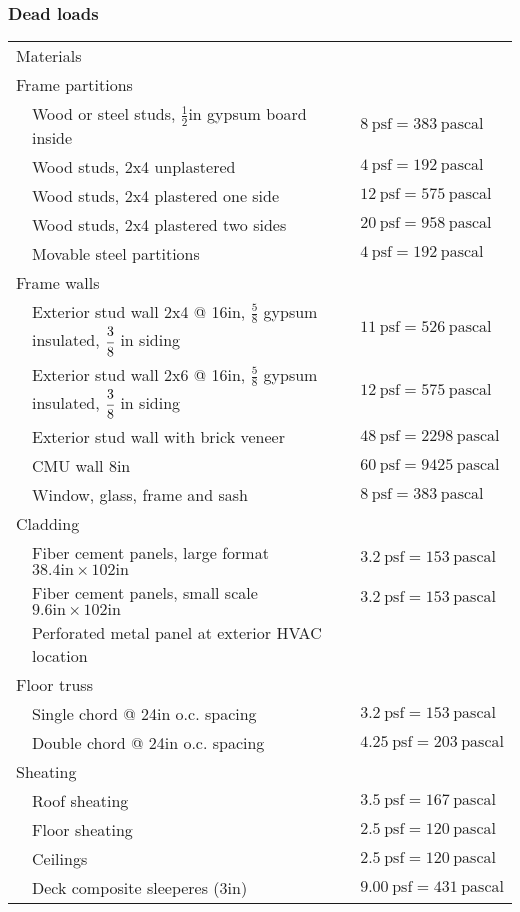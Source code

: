 
\subsubsection{Dead loads}
\begin{table}[h!]
\begin{tabular}{lp{8cm}p{10cm}}
\multicolumn{3}{l}{Materials}\\


\multicolumn{3}{l}{Frame partitions}\\
& Wood or steel studs, $\frac{1}{2}$in gypsum board inside & $8\ \mathrm{psf}= 383 \ \mathrm{pascal}$ \\
& Wood studs, 2x4 unplastered & $4\ \mathrm{psf}=192 \ \mathrm{pascal}$\\
& Wood studs, 2x4 plastered one side & $12\ \mathrm{psf}= 575\ \mathrm{pascal}$\\
& Wood studs, 2x4 plastered two sides & $20\ \mathrm{psf}=958 \ \mathrm{pascal}$\\
& Movable steel partitions &  $4\ \mathrm{psf}=192 \ \mathrm{pascal}$\\
\multicolumn{3}{l}{Frame walls}\\
& Exterior stud wall 2x4 @ 16in, $\frac{5}{8}$ gypsum insulated, $\cfrac{3}{8}$ in siding &  $11\ \mathrm{psf}=526 \ \mathrm{pascal}$\\
& Exterior stud wall 2x6 @ 16in, $\frac{5}{8}$ gypsum insulated, $\cfrac{3}{8}$ in siding &  $12\ \mathrm{psf}=575 \ \mathrm{pascal}$\\
& Exterior stud wall with brick veneer &   $48\ \mathrm{psf}=2298 \ \mathrm{pascal}$\\
& CMU wall 8in &   $60\ \mathrm{psf}=9425 \ \mathrm{pascal}$\\
& Window, glass, frame and sash & $8\ \mathrm{psf}=383 \ \mathrm{pascal}$\\
\multicolumn{3}{l}{Cladding}\\
& Fiber cement panels, large format $38.4\text{in} \times 102\text{in}$ & $3.2\ \mathrm{psf} = 153\ \mathrm{pascal}$ \\
& Fiber cement panels, small scale $9.6\text{in} \times 102\text{in}$ & $3.2\ \mathrm{psf} = 153\ \mathrm{pascal}$ \\
& Perforated metal panel at exterior HVAC location & \\
\multicolumn{3}{l}{Floor truss}\\
& Single chord @ 24in o.c. spacing & $3.2\ \mathrm{psf} = 153\ \mathrm{pascal}$ \\
& Double chord @ 24in o.c. spacing & $4.25\ \mathrm{psf} = 203\ \mathrm{pascal}$ \\
\multicolumn{3}{l}{Sheating}\\
& Roof sheating & $ 3.5\ \mathrm{psf} = 167\ \mathrm{pascal}$ \\
& Floor sheating & $ 2.5\ \mathrm{psf} = 120\ \mathrm{pascal}$ \\
& Ceilings & $ 2.5\ \mathrm{psf} = 120\ \mathrm{pascal}$ \\
& Deck composite sleeperes (3in) &  $9.00\ \mathrm{psf} = 431\ \mathrm{pascal}$ \\
\end{tabular}
\end{table}

